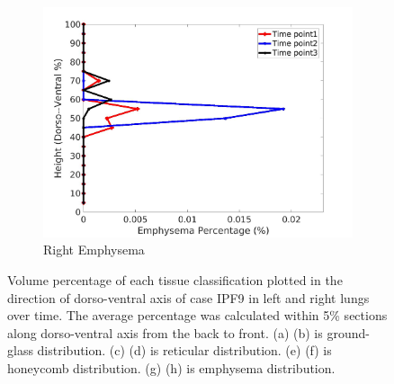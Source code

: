 \begin{figure}[H]
\begin{subfigure}{.42\linewidth}
  \includegraphics[width=\linewidth,trim={{.0\wd0} {.0\wd0} {.0\wd0} {.0\wd0}},clip]{Appendix/Image_AppexA/DorsoToVentral/IPF9RightLungEmphysemaDiseaseDorsoToVentral.jpg}
  \caption{Right Emphysema}
  \label{fig:IPF9DiseaseDorsoToVentral-h}
\end{subfigure}
\caption{Volume percentage of each tissue classification plotted in the direction of dorso-ventral axis of case IPF9 in left and right lungs over time. The average percentage was calculated within 5\% sections along dorso-ventral axis from the back to front. (a) (b) is ground-glass distribution. (c) (d) is reticular distribution. (e) (f) is honeycomb distribution. (g) (h) is emphysema distribution.}
\label{fig:IPF9DiseaseDorsoToVentral}
\end{figure}

